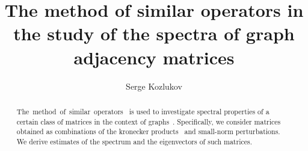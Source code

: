 \documentclass[a4paper]{jpconf}
\begin{document}
\title{The method of similar operators in the study of the spectra of graph adjacency matrices}

\author{Serge Kozlukov}

\address{\emph{Voronezh State University}, 1 Universitetskaya Ploshad', Voronezh, RU 394036}


\begin{abstract}
    The~method~of~similar~operators~\cite{baskakov1983methods,baskakov2014memory,baskakov2017method,baskakov2013completeness}
        is used to investigate spectral properties
        of a certain class of matrices in the context of graphs~\cite{van2003graphs,cvetkovic1980spectra}.
    Specifically, we consider matrices
        obtained as combinations
        of the kronecker products~\cite{bellman-matrices-kron,XIANG2005210}
        and small-norm perturbations.
    We derive estimates
        of the spectrum and the eigenvectors
        of such matrices.
\end{abstract}
\end{document}
